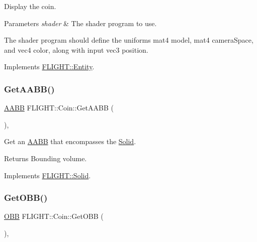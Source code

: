 Display the coin. 


\begin{DoxyParams}{Parameters}
{\em shader} & The shader program to use.\\
\hline
\end{DoxyParams}
The shader program should define the uniforms mat4 model, mat4 camera\+Space, and vec4 color, along with input vec3 position. 

Implements \hyperlink{class_f_l_i_g_h_t_1_1_entity_aa7416cd150913194b32255a46c2848ba}{F\+L\+I\+G\+H\+T\+::\+Entity}.

\mbox{\label{class_f_l_i_g_h_t_1_1_coin_a89d040ae510e248428277d8afed19515}} 
\subsubsection{\texorpdfstring{Get\+A\+A\+B\+B()}{GetAABB()}}
{\footnotesize\ttfamily \hyperlink{class_f_l_i_g_h_t_1_1_a_a_b_b}{A\+A\+BB} F\+L\+I\+G\+H\+T\+::\+Coin\+::\+Get\+A\+A\+BB (\begin{DoxyParamCaption}{ }\end{DoxyParamCaption})\hspace{0.3cm}{\ttfamily [override]}, {\ttfamily [virtual]}}



Get an \hyperlink{class_f_l_i_g_h_t_1_1_a_a_b_b}{A\+A\+BB} that encompasses the \hyperlink{class_f_l_i_g_h_t_1_1_solid}{Solid}. 

\begin{DoxyReturn}{Returns}
Bounding volume. 
\end{DoxyReturn}


Implements \hyperlink{class_f_l_i_g_h_t_1_1_solid_ae5db89380caf480ae8f5b203dab13e5b}{F\+L\+I\+G\+H\+T\+::\+Solid}.

\mbox{\label{class_f_l_i_g_h_t_1_1_coin_a7f4bf6128f703b6501a2596e8a562eea}} 
\subsubsection{\texorpdfstring{Get\+O\+B\+B()}{GetOBB()}}
{\footnotesize\ttfamily \hyperlink{class_f_l_i_g_h_t_1_1_o_b_b}{O\+BB} F\+L\+I\+G\+H\+T\+::\+Coin\+::\+Get\+O\+BB (\begin{DoxyParamCaption}{ }\end{DoxyParamCaption})\hspace{0.3cm}{\ttfamily [override]}, {\ttfamily [virtual]}}




